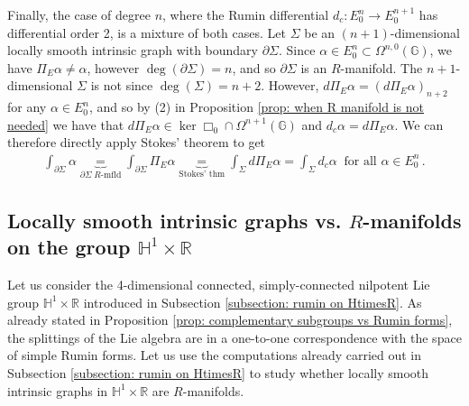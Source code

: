 \documentclass[dvipsnames]{amsart}
\theoremstyle{definition}
\theoremstyle{definition}
\numberwithin{equation}{section}
\newcommand{\R}{\mathbb{R}}
\newcommand{\G}{\mathbb{G}}
\renewcommand{\H}{\mathbb{H}}
\begin{document}
    Finally, the case of degree $n$, where the Rumin differential $d_c\colon E_0^n\to E_0^{n+1}$ has differential order 2, is a mixture of both cases. Let $\Sigma$ be an $(n+1)$-dimensional locally smooth intrinsic graph with boundary $\partial\Sigma$. Since $\alpha\in E_0^{n}\subset\Omega^{n,0}(\G)$, we have $\Pi_E\alpha\neq \alpha$, however $\operatorname{deg}(\partial\Sigma)=n$, and so $\partial\Sigma$ is  an $R$-manifold. The $n+1$-dimensional $\Sigma$ is not since $\operatorname{deg}(\Sigma)=n+2$. However, $d\Pi_E\alpha=(d\Pi_E\alpha)_{n+2}$ for any $\alpha\in E_0^n$, and so by (2) in Proposition \ref{prop: when R manifold is not needed}  we have that $d\Pi_E\alpha\in\ker\Box_0\cap\Omega^{n+1}(\G)$ and $d_c\alpha=d\Pi_E\alpha$. We can therefore directly apply Stokes' theorem to get
    \begin{align*}
        \int_{\partial\Sigma}\alpha\underbrace{=}_{\partial\Sigma\; R\text{-mfld}}\int_{\partial\Sigma}\Pi_E\alpha\underbrace{=}_{\text{Stokes' thm}}\int_{\Sigma}d\Pi_E\alpha=\int_{\Sigma}d_c\alpha\ \text{ for all }\alpha\in E_0^n\,.
    \end{align*}

\subsection{Locally smooth intrinsic graphs vs. $R$-manifolds on the group $\mathbb H^1\times\R$}\label{subsection: intrinsic graphs vs R mfld on H1timesR}
Let us consider the 4-dimensional connected, simply-connected nilpotent Lie group $\H^1\times\R$ introduced in Subsection \ref{subsection: rumin on HtimesR}.
As already stated in Proposition \ref{prop: complementary subgroups vs Rumin forms}, the splittings of the Lie algebra are in a one-to-one correspondence with the space of simple Rumin forms. Let us use the computations already carried out in Subsection \ref{subsection: rumin on HtimesR} to study whether locally smooth intrinsic graphs in $\H^1\times\R$ are $R$-manifolds.
\end{document}
